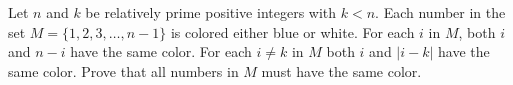 Let $n$ and $k$ be relatively prime positive integers with $k<n$. Each number in the set $M=\{1,2,3,\ldots,n-1\}$ is colored either blue or white. For each $i$ in $M$,  both $i$ and $n-i$ have the same color. For each $i\ne k$ in $M$ both $i$ and $|i-k|$ have the same color. Prove that all numbers in $M$ must have the same color.